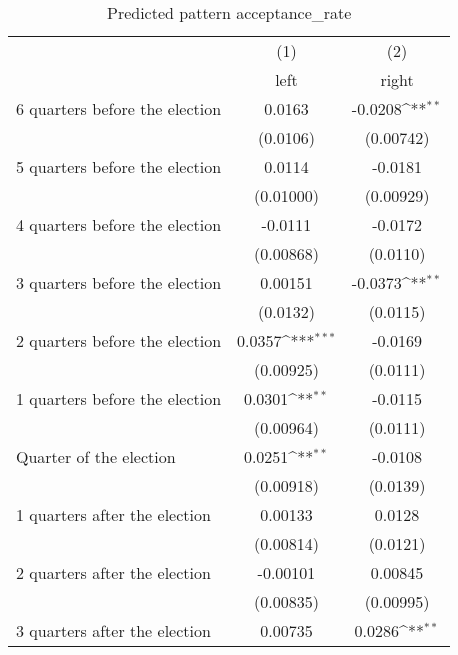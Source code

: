 \begin{table}[htbp]\centering
\def\sym#1{\ifmmode^{#1}\else\(^{#1}\)\fi}
\caption{Predicted pattern acceptance\_rate}
\begin{tabular}{l*{2}{c}}
\hline\hline
                    &\multicolumn{1}{c}{(1)}&\multicolumn{1}{c}{(2)}\\
                    &\multicolumn{1}{c}{left}&\multicolumn{1}{c}{right}\\
\hline
 6 quarters before the election&      0.0163         &     -0.0208\sym{**} \\
                    &    (0.0106)         &   (0.00742)         \\
[1em]
 5 quarters before the election&      0.0114         &     -0.0181         \\
                    &   (0.01000)         &   (0.00929)         \\
[1em]
 4 quarters before the election&     -0.0111         &     -0.0172         \\
                    &   (0.00868)         &    (0.0110)         \\
[1em]
 3 quarters before the election&     0.00151         &     -0.0373\sym{**} \\
                    &    (0.0132)         &    (0.0115)         \\
[1em]
 2 quarters before the election&      0.0357\sym{***}&     -0.0169         \\
                    &   (0.00925)         &    (0.0111)         \\
[1em]
 1 quarters before the election&      0.0301\sym{**} &     -0.0115         \\
                    &   (0.00964)         &    (0.0111)         \\
[1em]
Quarter of the election&      0.0251\sym{**} &     -0.0108         \\
                    &   (0.00918)         &    (0.0139)         \\
[1em]
 1 quarters after the election&     0.00133         &      0.0128         \\
                    &   (0.00814)         &    (0.0121)         \\
[1em]
 2 quarters after the election&    -0.00101         &     0.00845         \\
                    &   (0.00835)         &   (0.00995)         \\
[1em]
 3 quarters after the election&     0.00735         &      0.0286\sym{**} \\

\end{tabular}
\end{table}
